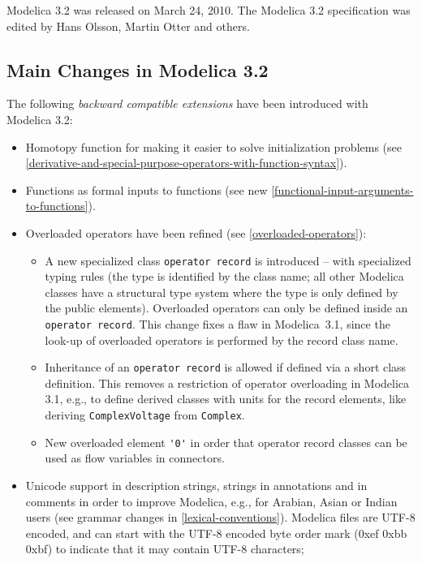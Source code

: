 Modelica 3.2 was released on March 24, 2010. The Modelica 3.2
specification was edited by Hans Olsson, Martin Otter and others.

\subsection{Main Changes in Modelica 3.2}\label{main-changes-in-modelica-3-2}

The following \emph{backward compatible extensions} have been introduced with Modelica 3.2:
\begin{itemize}
\item
  Homotopy function for making it easier to solve initialization
  problems (see \cref{derivative-and-special-purpose-operators-with-function-syntax}).
\item
  Functions as formal inputs to functions (see new \cref{functional-input-arguments-to-functions}).
\item
  Overloaded operators have been refined (see \cref{overloaded-operators}):
  \begin{itemize}
  \item
    A new specialized class \lstinline!operator record! is introduced -- with specialized typing rules (the type is identified by the class name; all other Modelica classes have a structural type
    system where the type is only defined by the public elements).  Overloaded operators can only be defined inside an \lstinline!operator record!.  This change fixes a flaw in Modelica~3.1, since
    the look-up of overloaded operators is performed by the record class name.
  \item
    Inheritance of an \lstinline!operator record! is allowed if defined via a short class definition.  This removes a restriction of operator overloading in Modelica 3.1, e.g., to define derived classes with units for the record elements, like deriving \lstinline!ComplexVoltage! from \lstinline!Complex!.
  \item
    New overloaded element \lstinline!'0'! in order that operator record classes can
    be used as flow variables in connectors.
  \end{itemize}
\item
  Unicode support in description strings, strings in annotations and in
  comments in order to improve Modelica, e.g., for Arabian, Asian or
  Indian users (see grammar changes in \cref{lexical-conventions}). Modelica files are
  UTF-8 encoded, and can start with the UTF-8 encoded byte order mark
  (0xef 0xbb 0xbf) to indicate that it may contain UTF-8 characters;

\end{itemize}

